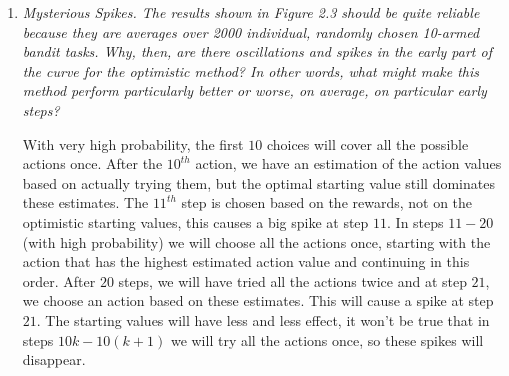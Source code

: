 \documentclass[12pt,a4paper]{article}
\begin{document}
\begin{enumerate}
\item
  \textit{Mysterious Spikes. The results shown in Figure 2.3 should be quite reliable
  because they are averages over 2000 individual, randomly chosen 10-armed bandit tasks.
  Why, then, are there oscillations and spikes in the early part of the curve for
  the optimistic method? In other words, what might make this method
  perform particularly better or worse, on average, on particular early steps?}

  With very high probability, the first $10$ choices will cover all the possible actions
  once. After the $10^{th}$ action, we have an estimation of the action values based
  on actually trying them, but the optimal starting value still dominates these estimates.
  The $11^{th}$ step is chosen based on the rewards, not on the optimistic starting values,
  this causes a big spike at step $11$. In steps $11-20$ (with high probability) we will
  choose all the actions once, starting with the action that has the highest estimated
  action value and continuing in this order. After $20$ steps, we will have tried all
  the actions twice and at step $21$, we choose an action based on these estimates.
  This will cause a spike at step $21$.
  The starting values will have less and less effect, it won't be true that in steps
  $10k - 10(k + 1)$ we will try all the actions once, so these spikes will disappear.


\end{enumerate}
\end{document}
